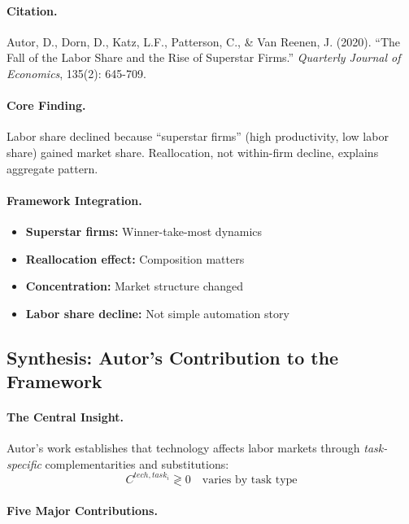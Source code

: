 \documentclass[12pt,a4paper]{article}
\begin{document}
\paragraph{Citation.}
Autor, D., Dorn, D., Katz, L.F., Patterson, C., \& Van Reenen, J. (2020).
``The Fall of the Labor Share and the Rise of Superstar Firms.''
\emph{Quarterly Journal of Economics}, 135(2): 645-709.

\paragraph{Core Finding.}
Labor share declined because ``superstar firms'' (high productivity,
low labor share) gained market share. Reallocation, not within-firm
decline, explains aggregate pattern.

\paragraph{Framework Integration.}
\begin{itemize}
  \item \textbf{Superstar firms:} Winner-take-most dynamics
  \item \textbf{Reallocation effect:} Composition matters
  \item \textbf{Concentration:} Market structure changed
  \item \textbf{Labor share decline:} Not simple automation story
\end{itemize}

\subsection{Synthesis: Autor's Contribution to the Framework}

\paragraph{The Central Insight.}
Autor's work establishes that technology affects labor markets through
\emph{task-specific} complementarities and substitutions:
\begin{equation}
  C^{tech,task_i} \gtrless 0 \quad \text{varies by task type}
\end{equation}

\paragraph{Five Major Contributions.}
\end{document}
